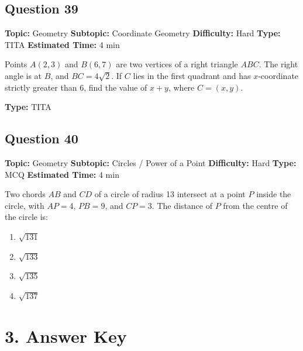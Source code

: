 \documentclass[11pt]{article}
\begin{document}
\subsection*{Question 39}
\textbf{Topic:} Geometry \quad \textbf{Subtopic:} Coordinate Geometry \quad \textbf{Difficulty:} Hard \quad \textbf{Type:} TITA \quad \textbf{Estimated Time:} 4 min

\begin{tcolorbox}
Points $A(2, 3)$ and $B(6, 7)$ are two vertices of a right triangle $ABC$. The right angle is at $B$, and $BC = 4\sqrt{2}$. If $C$ lies in the first quadrant and has $x$-coordinate strictly greater than 6, find the value of $x + y$, where $C = (x, y)$.
\end{tcolorbox}
\textbf{Type:} TITA

\subsection*{Question 40}
\textbf{Topic:} Geometry \quad \textbf{Subtopic:} Circles / Power of a Point \quad \textbf{Difficulty:} Hard \quad \textbf{Type:} MCQ \quad \textbf{Estimated Time:} 4 min

\begin{tcolorbox}
Two chords $AB$ and $CD$ of a circle of radius 13 intersect at a point $P$ inside the circle, with $AP = 4$, $PB = 9$, and $CP = 3$. The distance of $P$ from the centre of the circle is:
\end{tcolorbox}
\begin{enumerate}[label=(\Alph*)]
\item $\sqrt{131}$
\item $\sqrt{133}$
\item $\sqrt{135}$
\item $\sqrt{137}$
\end{enumerate}

\newpage
\section*{3. Answer Key}
\end{document}
